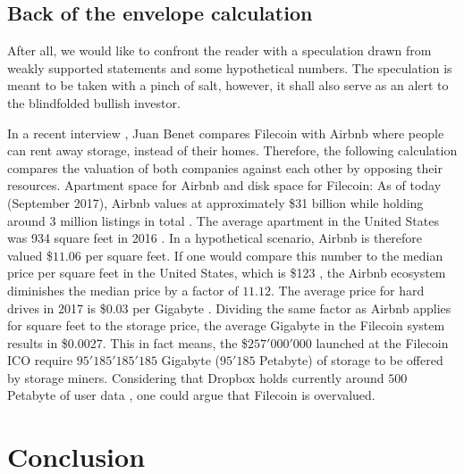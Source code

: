 \documentclass[conference]{IEEEtran}
\begin{document}
\subsection{Back of the envelope calculation}

After all, we would like to confront the reader with a speculation drawn from weakly supported statements and some hypothetical numbers.
The speculation is meant to be taken with a pinch of salt, however, it shall also serve as an alert to the blindfolded bullish investor.

In a recent interview \cite{podcast}, Juan Benet compares Filecoin with Airbnb \cite{airbnb} where people can rent away storage, instead of their homes.
Therefore, the following calculation compares the valuation of both companies against each other by opposing their resources.
Apartment space for Airbnb and disk space for Filecoin:
As of today (September 2017), Airbnb values at approximately \$31 billion while holding around 3 million listings in total \cite{airbnb-valuation}.
The average apartment in the United States was 934 square feet in 2016 \cite{housing-cnbc}.
In a hypothetical scenario, Airbnb is therefore valued \$$11.06$ per square feet. 
If one would compare this number to the median price per square feet in the United States, which is \$123 \cite{home-prices}, the Airbnb ecosystem diminishes the median price by a factor of $11.12$.
The average price for hard drives in 2017 is \$0.03 per Gigabyte \cite{hard-drive}.
Dividing the same factor as Airbnb applies for square feet to the storage price, the average Gigabyte in the Filecoin system results in \$0.0027.
This in fact means, the \$$257'000'000$ launched at the Filecoin ICO require $95'185'185'185$ Gigabyte ($95'185$ Petabyte) of storage to be offered by storage miners.
Considering that Dropbox \cite{dropbox} holds currently around $500$ Petabyte of user data \cite{dropbox-userdata}, one could argue that Filecoin is overvalued.

\section{Conclusion}
\label{sec:conclusion}

\ifCLASSOPTIONcaptionsoff
  \newpage
\fi

\end{document}
